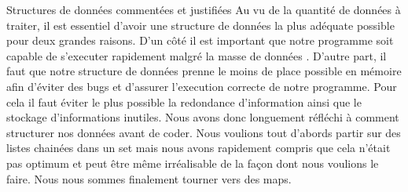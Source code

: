 \documentclass{article}
\begin{document}
\begin{section}{Structures de données commentées et justifiées}
Au vu de la quantité de données à traiter, il est essentiel d'avoir une structure de données la plus adéquate possible pour deux grandes raisons. D'un côté il est important que notre programme soit capable de s'executer rapidement malgré la masse de données . D'autre part, il faut que notre structure de données prenne le moins de place possible en mémoire afin d'éviter des bugs et d'assurer l'execution correcte de notre programme. Pour cela il faut éviter le plus possible la redondance d'information ainsi que le stockage d'informations inutiles.
Nous avons donc longuement réfléchi à comment structurer nos données avant de coder. Nous voulions tout d'abords partir sur des listes chainées dans un set mais nous avons rapidement compris que cela n'était pas optimum et peut être même irréalisable de la façon dont nous voulions le faire. Nous nous sommes finalement tourner vers des maps.
\end{section}
\end{document}
